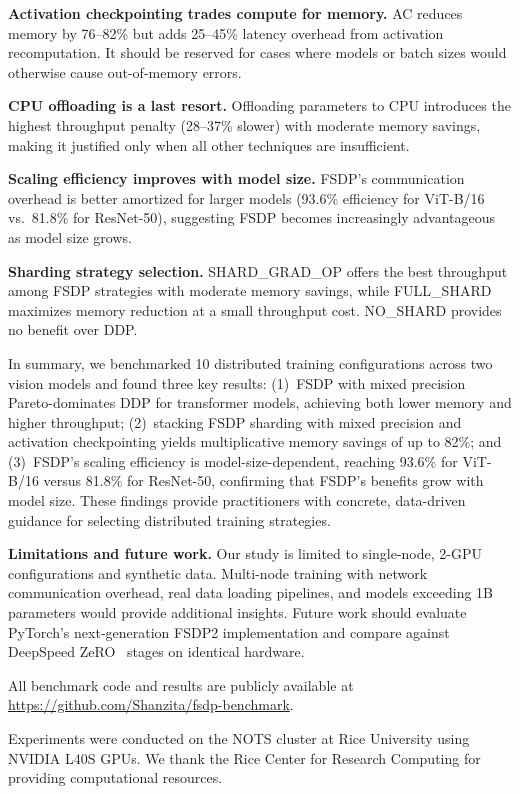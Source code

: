 \documentclass[sigconf]{acmart}
\begin{document}
\textbf{Activation checkpointing trades compute for memory.} AC reduces memory by 76--82\% but adds 25--45\% latency overhead from activation recomputation. It should be reserved for cases where models or batch sizes would otherwise cause out-of-memory errors.

\textbf{CPU offloading is a last resort.} Offloading parameters to CPU introduces the highest throughput penalty (28--37\% slower) with moderate memory savings, making it justified only when all other techniques are insufficient.

\textbf{Scaling efficiency improves with model size.} FSDP's communication overhead is better amortized for larger models (93.6\% efficiency for ViT-B/16 vs.\ 81.8\% for ResNet-50), suggesting FSDP becomes increasingly advantageous as model size grows.

\textbf{Sharding strategy selection.} SHARD\_GRAD\_OP offers the best throughput among FSDP strategies with moderate memory savings, while FULL\_SHARD maximizes memory reduction at a small throughput cost. NO\_SHARD provides no benefit over DDP.

In summary, we benchmarked 10 distributed training configurations across two vision models and found three key results: (1)~FSDP with mixed precision Pareto-dominates DDP for transformer models, achieving both lower memory and higher throughput; (2)~stacking FSDP sharding with mixed precision and activation checkpointing yields multiplicative memory savings of up to 82\%; and (3)~FSDP's scaling efficiency is model-size-dependent, reaching 93.6\% for ViT-B/16 versus 81.8\% for ResNet-50, confirming that FSDP's benefits grow with model size. These findings provide practitioners with concrete, data-driven guidance for selecting distributed training strategies.

\textbf{Limitations and future work.} Our study is limited to single-node, 2-GPU configurations and synthetic data. Multi-node training with network communication overhead, real data loading pipelines, and models exceeding 1B parameters would provide additional insights. Future work should evaluate PyTorch's next-generation FSDP2 implementation and compare against DeepSpeed ZeRO~\cite{rasley2020deepspeed} stages on identical hardware.

All benchmark code and results are publicly available at \url{https://github.com/Shanzita/fsdp-benchmark}.

\begin{acks}
Experiments were conducted on the NOTS cluster at Rice University using NVIDIA L40S GPUs. We thank the Rice Center for Research Computing for providing computational resources.
\end{acks}



\end{document}
